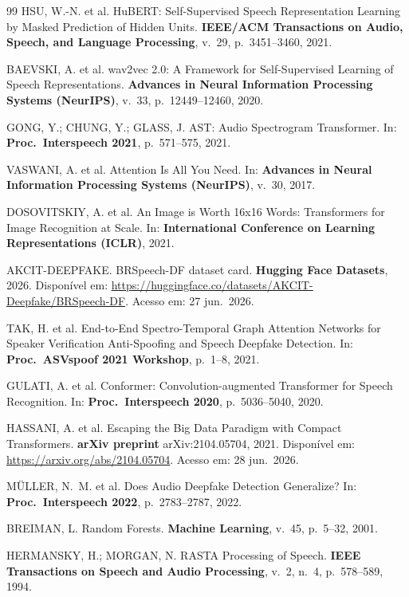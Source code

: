 \documentclass[12pt,a4paper]{article}
\begin{document}
\begin{thebibliography}{99}
HSU, W.-N. et al.
HuBERT: Self-Supervised Speech Representation Learning by Masked Prediction
of Hidden Units.
\textbf{IEEE/ACM Transactions on Audio, Speech, and Language Processing},
v.~29, p.~3451--3460, 2021.

BAEVSKI, A. et al.
wav2vec 2.0: A Framework for Self-Supervised Learning of Speech
Representations.
\textbf{Advances in Neural Information Processing Systems (NeurIPS)},
v.~33, p.~12449--12460, 2020.

GONG, Y.; CHUNG, Y.; GLASS, J.
AST: Audio Spectrogram Transformer.
In: \textbf{Proc.\ Interspeech 2021}, p.~571--575, 2021.

VASWANI, A. et al.
Attention Is All You Need.
In: \textbf{Advances in Neural Information Processing Systems (NeurIPS)},
v.~30, 2017.

DOSOVITSKIY, A. et al.
An Image is Worth 16x16 Words: Transformers for Image Recognition at Scale.
In: \textbf{International Conference on Learning Representations (ICLR)}, 2021.

AKCIT-DEEPFAKE.
BRSpeech-DF dataset card.
\textbf{Hugging Face Datasets}, 2026.
Disponível em: \url{https://huggingface.co/datasets/AKCIT-Deepfake/BRSpeech-DF}.
Acesso em: 27 jun.\ 2026.

TAK, H. et al.
End-to-End Spectro-Temporal Graph Attention Networks for Speaker Verification
Anti-Spoofing and Speech Deepfake Detection.
In: \textbf{Proc.\ ASVspoof 2021 Workshop}, p.~1--8, 2021.

GULATI, A. et al.
Conformer: Convolution-augmented Transformer for Speech Recognition.
In: \textbf{Proc.\ Interspeech 2020}, p.~5036--5040, 2020.

HASSANI, A. et al.
Escaping the Big Data Paradigm with Compact Transformers.
\textbf{arXiv preprint} arXiv:2104.05704, 2021.
Disponível em: \url{https://arxiv.org/abs/2104.05704}.
Acesso em: 28 jun.\ 2026.

MÜLLER, N.~M. et al.
Does Audio Deepfake Detection Generalize?
In: \textbf{Proc.\ Interspeech 2022}, p.~2783--2787, 2022.

BREIMAN, L.
Random Forests.
\textbf{Machine Learning},
v.~45, p.~5--32, 2001.

HERMANSKY, H.; MORGAN, N.
RASTA Processing of Speech.
\textbf{IEEE Transactions on Speech and Audio Processing},
v.~2, n.~4, p.~578--589, 1994.


\end{thebibliography}
\end{document}

